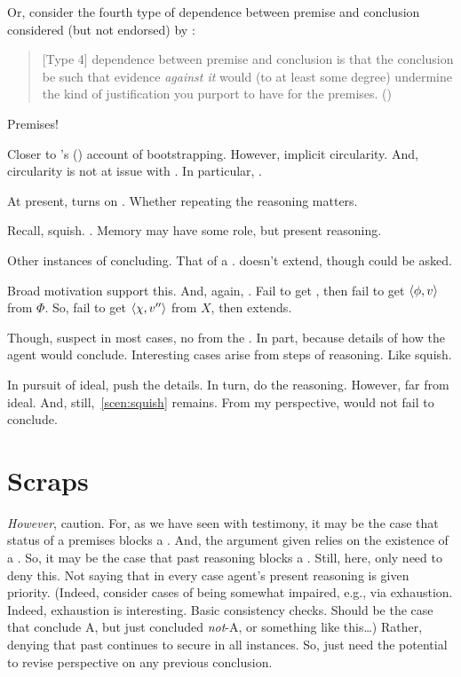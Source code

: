 \begin{note}
{    Or, consider the fourth type of dependence between premise and conclusion considered (but not endorsed) by \textcite{Pryor:2004ws}:

  \begin{quote}
    [Type 4] dependence between premise and conclusion is that the conclusion be such that evidence \emph{against it} would (to at least some degree) undermine the kind of justification you purport to have for the premises.%
    \mbox{}\hfill\mbox{(\citeyear[359]{Pryor:2004ws})}
  \end{quote}
  Premises!

  \nocite{Weisberg:2012vs}
  Closer to \citeauthor{Weisberg:2010to}'s (\citeyear{Weisberg:2010to}) account of bootstrapping.
  However, implicit circularity.
  And, circularity is not at issue with \qzS{}.
  In particular, \curb{}.
  }

  At present, turns on \curb{}.
  Whether repeating the reasoning matters.

  Recall, squish.
  \curb{}.
  Memory may have some role, but present reasoning.
\end{note}

\begin{note}
  Other instances of concluding.
  That of a \curb{}.
  \qzS{} doesn't extend, though \qzS{} could be asked.

  Broad motivation support this.
  And, again, .
  Fail to get \curb{}, then fail to get \(\langle \phi, v \rangle\) from \(\Phi\).
  So, fail to get \(\langle \chi, v'' \rangle\) from \(X\), then extends.

  Though, suspect in most cases, no \curb{} from the \agpe{}.
  In part, because details of how the agent would conclude.
  Interesting cases arise from steps of reasoning.
  Like squish.

  In pursuit of ideal, push the details.
  In turn, do the reasoning.
  However, far from ideal.
  And, still,~\autoref{scen:squish} remains.
  From my perspective, would not fail to conclude.
\end{note}


\section{Scraps}
\label{sec:scraps}

\begin{note}
  \emph{However}, caution.
  For, as we have seen with testimony, it may be the case that status of a premises blocks a \curb{}.
  And, the argument given relies on the existence of a \curb{}.
  So, it may be the case that past reasoning blocks a \curb{}.
  Still, here, only need to deny this.
  Not saying that in every case agent's present reasoning is given priority.
  (Indeed, consider cases of being somewhat impaired, e.g., via exhaustion.
  Indeed, exhaustion is interesting.
  Basic consistency checks.
  Should be the case that conclude A, but just concluded \emph{not}-A, or something like this\dots)
  Rather, denying that past continues to secure in all instances.
  So, just need the potential to revise perspective on any previous conclusion.
\end{note}



